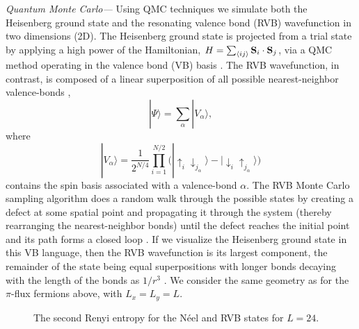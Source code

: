 \documentclass[prl,aps,twocolumn,floatfix,amsmath,amssymb,superscriptaddress,tightenlines]{revtex4}
\begin{document}
{\it Quantum Monte Carlo---}
Using QMC techniques we simulate both the
Heisenberg ground state and the resonating valence bond (RVB)
wavefunction in two dimensions (2D).  The Heisenberg ground state is
projected from a trial state by applying a high power of the
Hamiltonian, $H = \sum_{\langle ij \rangle} {\bf S}_i \cdot {\bf S}_j$, via a QMC method operating in the valence bond (VB)
basis \cite{Sandvik}. %
The RVB wavefunction, in contrast, 
is composed of a linear superposition of all possible 
nearest-neighbor valence-bonds \cite{RVB1,RVB2},
\begin{equation}
| \Psi \rangle = \sum_{\alpha} | V_{\alpha} \rangle,
\end{equation}
where
\begin{equation}
|V_{\alpha} \rangle =  \frac{1}{2^{N/4}} \prod_{i=1}^{N/2} \big( | \uparrow_i \downarrow_{j_{\alpha}} \rangle -  | \downarrow_i  \uparrow_{j_{\alpha}} \rangle \big)
\end{equation}
contains the spin basis associated with a valence-bond $\alpha$.
The RVB 
Monte Carlo sampling
algorithm does a random walk through the possible states by creating a
defect at some spatial point and propagating it through the system (thereby
rearranging the nearest-neighbor bonds) until the defect reaches the
initial point and its path forms a closed loop \cite{AWSloop}.
If we visualize the Heisenberg ground state in this VB language, then the RVB wavefunction is its largest component, the remainder of the state being equal superpositions with longer bonds decaying with the length of the bonds as $1/r^3$ \cite{Sandvik}.
We consider the same geometry as for the $\pi$-flux fermions above, with $L_x=L_y=L$.

 \begin{figure}
   \begin{center}
   \end{center}
   \caption{ The second Renyi entropy for the N\'eel and RVB states for $L=24$.
   \label{fig:heis_bow} }
 \end{figure}
\end{document}
